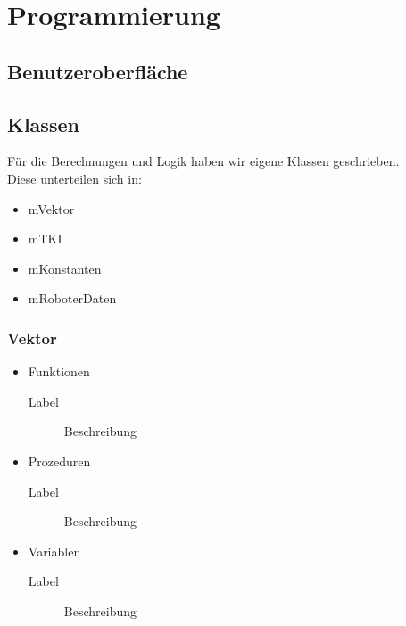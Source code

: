 \section{Programmierung}

\subsection{Benutzeroberfläche}

\subsection{Klassen}
Für die Berechnungen und Logik haben wir eigene Klassen geschrieben.\\
\newline
Diese unterteilen sich in:
\begin{itemize}
	\item mVektor
	\item mTKI
	\item mKonstanten
	\item mRoboterDaten
\end{itemize}

\subsubsection{Vektor}
\begin{itemize}
	\item Funktionen
	\begin{description}
		\item[Label] Beschreibung
	\end{description}
	\item Prozeduren
	\begin{description}
		\item[Label] Beschreibung
	\end{description}
	\item Variablen
	\begin{description}
		\item[Label] Beschreibung
	\end{description}
\end{itemize}

